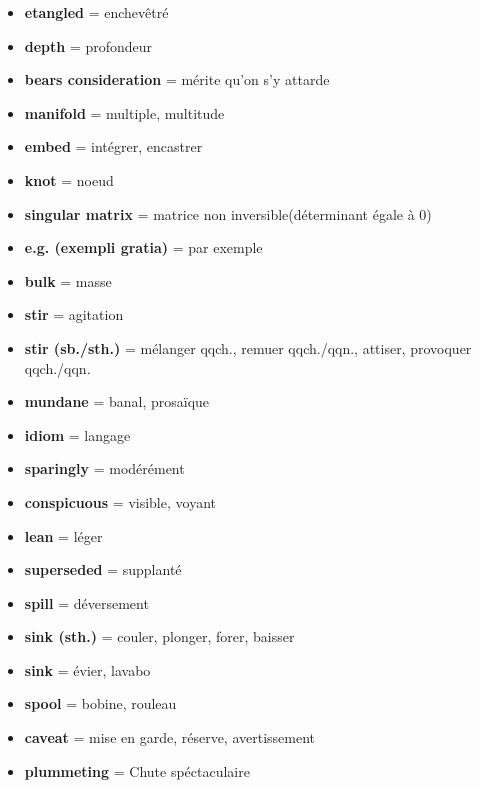 \documentclass[french]{article}
\begin{document}
\begin{itemize}[label=\textbullet]
	\item \textbf{etangled} = enchevêtré
	\item \textbf{depth} = profondeur
	\item \textbf{bears consideration} = mérite qu'on s'y attarde
	\item \textbf{manifold} = multiple, multitude
	\item \textbf{embed} = intégrer, encastrer
	\item \textbf{knot} = noeud
	\item \textbf{singular matrix} = matrice non inversible(déterminant égale à 0)
	\item \textbf{e.g. (exempli gratia)} = par exemple
	\item \textbf{bulk} = masse
	\item \textbf{stir} = agitation
	\item \textbf{stir (sb./sth.)} = mélanger qqch., remuer qqch./qqn., attiser, provoquer qqch./qqn.
	\item \textbf{mundane} = banal, prosaïque
	\item \textbf{idiom} = langage
	\item \textbf{sparingly} = modérément 
	\item \textbf{conspicuous} = visible, voyant
	\item \textbf{lean} = léger
	\item \textbf{superseded} = supplanté
	\item \textbf{spill} = déversement
	\item \textbf{sink (sth.)} = couler, plonger, forer, baisser
	\item \textbf{sink} = évier, lavabo
	\item \textbf{spool} = bobine, rouleau
	\item \textbf{caveat} = mise en garde, réserve, avertissement
	\item \textbf{plummeting} = Chute spéctaculaire
	\\
\end{itemize}
\end{document}
